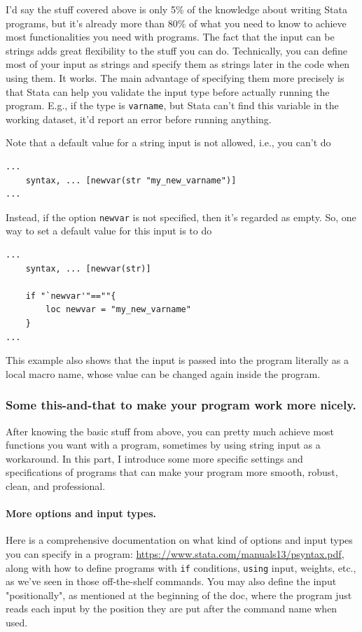 I'd say the stuff covered above is only 5\% of the knowledge about writing Stata programs, but it's already more than 80\% of what you need to know to achieve most functionalities you need with programs. The fact that the input can be strings adds great flexibility to the stuff you can do. Technically, you can define most of your input as strings and specify them as strings later in the code when using them. It works. The main advantage of specifying them more precisely is that Stata can help you validate the input type before actually running the program. E.g., if the type is \verb|varname|, but Stata can't find this variable in the working dataset, it'd report an error before running anything. 

Note that a default value for a string input is not allowed, i.e., you can't do 
\begin{verbatim}
...
    syntax, ... [newvar(str "my_new_varname")]
...
\end{verbatim}
Instead, if the option \verb|newvar| is not specified, then it's regarded as empty. So, one way to set a default value for this input is to do 
\begin{verbatim}
...
    syntax, ... [newvar(str)]

    if "`newvar'"==""{
        loc newvar = "my_new_varname"
    }
...
\end{verbatim}
This example also shows that the input is passed into the program literally as a local macro name, whose value can be changed again inside the program. 

\subsubsection{Some this-and-that to make your program work more nicely.} After knowing the basic stuff from above, you can pretty much achieve most functions you want with a program, sometimes by using string input as a workaround. In this part, I introduce some more specific settings and specifications of programs that can make your program more smooth, robust, clean, and professional. 

\paragraph{More options and input types.} Here is a comprehensive documentation on what kind of options and input types you can specify in a program: \url{https://www.stata.com/manuals13/psyntax.pdf}, along with how to define programs with \verb|if| conditions, \verb|using| input, weights, etc., as we've seen in those off-the-shelf commands. You may also define the input "positionally", as mentioned at the beginning of the doc, where the program just reads each input by the position they are put after the command name when used. 

